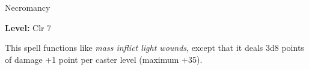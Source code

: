 \label{spell:Mass Inflict Serious Wounds}

Necromancy

\textbf{Level:} Clr 7

This spell functions like \textit{mass inflict light wounds}, except that it deals 
3d8 points of damage +1 point per caster level (maximum +35).

